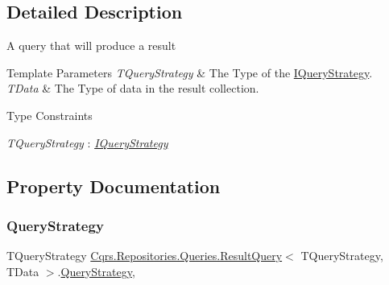\subsection{Detailed Description}
A query that will produce a result 


\begin{DoxyTemplParams}{Template Parameters}
{\em T\+Query\+Strategy} & The Type of the \hyperlink{interfaceCqrs_1_1Repositories_1_1Queries_1_1IQueryStrategy}{I\+Query\+Strategy}.\\
\hline
{\em T\+Data} & The Type of data in the result collection.\\
\hline
\end{DoxyTemplParams}
\begin{Desc}
\item[Type Constraints]\begin{description}
\item[{\em T\+Query\+Strategy} : {\em \hyperlink{interfaceCqrs_1_1Repositories_1_1Queries_1_1IQueryStrategy}{I\+Query\+Strategy}}]\end{description}
\end{Desc}


\subsection{Property Documentation}
\mbox{\label{classCqrs_1_1Repositories_1_1Queries_1_1ResultQuery_abad7775345c741c688bab2ec4671ba6b_abad7775345c741c688bab2ec4671ba6b}} 
\subsubsection{\texorpdfstring{Query\+Strategy}{QueryStrategy}}
{\footnotesize\ttfamily T\+Query\+Strategy \hyperlink{classCqrs_1_1Repositories_1_1Queries_1_1ResultQuery}{Cqrs.\+Repositories.\+Queries.\+Result\+Query}$<$ T\+Query\+Strategy, T\+Data $>$.\hyperlink{classCqrs_1_1Repositories_1_1Queries_1_1QueryStrategy}{Query\+Strategy}\hspace{0.3cm}{\ttfamily [get]}, {\ttfamily [set]}}




